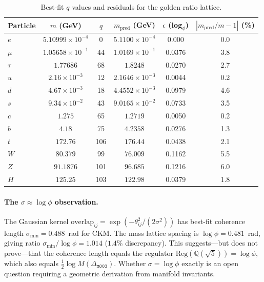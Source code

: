 ﻿\documentclass[12pt]{article}
\theoremstyle{definition}
\begin{document}
\begin{table}[htbp]
\centering
\caption{Best-fit $q$ values and residuals for the golden ratio lattice.}
\label{tab:masses}
\begin{tabular}{lccccc}
\toprule
Particle & $m$ (GeV) & $q$ & $m_{\text{pred}}$ (GeV) & $\epsilon$ (log$_\phi$) & $|m_{\text{pred}}/m - 1|$ (\%) \\
\midrule
$e$     & $5.10999\times10^{-4}$ & 0    & $5.1100\times10^{-4}$ & 0.000 & 0.0\\
$\mu$   & $1.05658\times10^{-1}$ & 44   & $1.0169\times10^{-1}$ & 0.0376 & 3.8\\
$\tau$  & $1.77686$              & 68   & $1.8248$               & 0.0270 & 2.7\\
$u$     & $2.16\times10^{-3}$    & 12   & $2.1646\times10^{-3}$ & 0.0044 & 0.2\\
$d$     & $4.67\times10^{-3}$    & 18   & $4.4552\times10^{-3}$ & 0.0979 & 4.6\\
$s$     & $9.34\times10^{-2}$    & 43   & $9.0165\times10^{-2}$ & 0.0733 & 3.5\\
$c$     & $1.275$                & 65   & $1.2719$               & 0.0050 & 0.2\\
$b$     & $4.18$                 & 75   & $4.2358$               & 0.0276 & 1.3\\
$t$     & $172.76$               & 106  & $176.44$               & 0.0438 & 2.1\\
$W$     & $80.379$               & 99   & $76.009$               & 0.1162 & 5.5\\
$Z$     & $91.1876$              & 101  & $96.685$               & 0.1216 & 6.0\\
$H$     & $125.25$               & 103  & $122.98$               & 0.0379 & 1.8\\
\bottomrule
\end{tabular}
\end{table}



\paragraph{The $\sigma\approx\log\phi$ observation.}
The Gaussian kernel
$\mathrm{overlap}_{ij}=\exp(-\theta_{ij}^2/(2\sigma^2))$
has best-fit coherence length $\sigma_{\min}=0.488$~rad for CKM.
The mass lattice spacing is $\log\phi=0.481$~rad, giving ratio
$\sigma_{\min}/\log\phi=1.014$ ($1.4\%$ discrepancy).
This suggests---but does not prove---that the coherence length
equals the regulator $\mathrm{Reg}(\mathbb{Q}(\sqrt5))=\log\phi$,
which also equals $\tfrac{1}{2}\log M(\Delta_{\texttt{m003}})$.
Whether $\sigma=\log\phi$ exactly is an open question requiring
a geometric derivation from manifold invariants.
\end{document}
